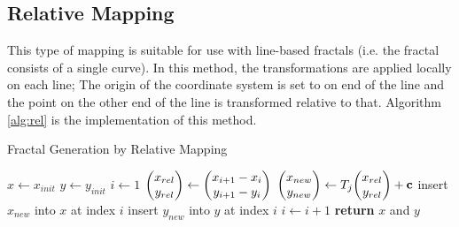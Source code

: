 \documentclass[12pt,a4paper]{article}
\begin{document}
    \subsection{Relative Mapping}
    This type of mapping is suitable for use with line-based fractals (i.e. the fractal consists of a single curve).
    In this method, the transformations are applied locally on each line; The origin of the coordinate system is set
    to on end of the line and the point on the other end of the line is transformed relative to that.
    Algorithm \ref{alg:rel} is the implementation of this method.
    \begin{algorithm}
        \caption{Fractal Generation by Relative Mapping}
        \label{alg:rel}
        \begin{algorithmic}[1]
                \State $x \gets x_{init}$
                \State $y \gets y_{init}$
                    \State $i \gets 1$
                        \State $\mqty(x_{rel} \\ y_{rel}) \gets \mqty(x_{i+1} - x_i \\ y_{i+1} - y_i)$
                            \State $\mqty(x_{new} \\ y_{new}) \gets T_j\mqty(x_{rel} \\ y_{rel}) + \vb{c}$
                            \State insert $x_{new}$ into $x$ at index $i$
                            \State insert $y_{new}$ into $y$ at index $i$
                            \State $i \gets i+1$
                        \EndFor
                    \EndWhile
                \EndFor
                \State \textbf{return} $x$ and $y$
            \EndFunction
        \end{algorithmic}
    \end{algorithm}
\end{document}
